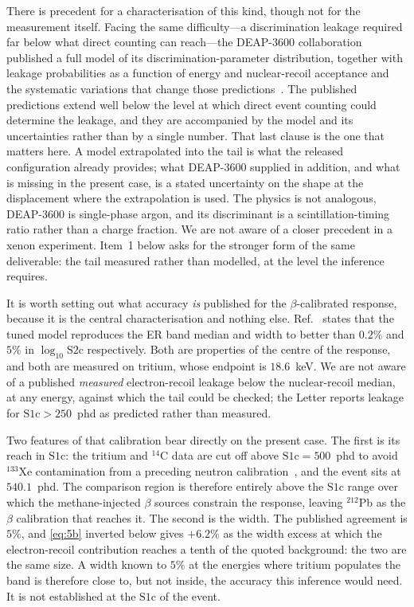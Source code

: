 \documentclass[11pt,a4paper]{article}
\begin{document}
There is precedent for a characterisation of this kind, though not for
the measurement itself. Facing the same difficulty---a discrimination
leakage required far below what direct counting can reach---the
DEAP-3600 collaboration published a full model of its
discrimination-parameter distribution, together with leakage
probabilities as a function of energy and nuclear-recoil acceptance and
the systematic variations that change those predictions~\cite{DEAP}.
The published predictions extend well below the level at which direct
event counting could determine the leakage, and they are accompanied by
the model and its uncertainties rather than by a single number. That
last clause is the one that matters here. A model
extrapolated into the tail is what the released configuration already
provides; what DEAP-3600 supplied in addition, and what is missing in
the present case, is a stated uncertainty on the shape at the
displacement where the extrapolation is used. The physics is not
analogous, DEAP-3600 is single-phase argon, and its discriminant is a
scintillation-timing ratio rather than a charge fraction. We are
not aware of a closer precedent in a xenon experiment. Item~1 below asks
for the stronger form of the same deliverable: the tail measured rather
than modelled, at the level the inference requires.

It is worth setting out what accuracy \emph{is} published for the
\(\beta\)-calibrated response, because it is the central characterisation
and nothing else. Ref.~\cite{WS2024} states that the tuned model
reproduces the ER band median and width to better than \(0.2\%\) and
\(5\%\) in \(\log_{10}\mathrm{S2c}\) respectively. Both are properties of
the centre of the response, and both are measured on tritium, whose
endpoint is \(18.6\)~keV. We are not aware of a published \emph{measured}
electron-recoil leakage below the nuclear-recoil median, at any energy,
against which the tail could be checked; the Letter reports leakage for
\(\mathrm{S1c}>250\)~phd as predicted rather than measured.

Two features of that calibration bear directly on the present case. The
first is its reach in \(\mathrm{S1c}\): the tritium and \(^{14}\)C data
are cut off above \(\mathrm{S1c}=500\)~phd to avoid \(^{133}\)Xe
contamination from a preceding neutron calibration~\cite{LZ:2026axp}, and
the event sits at \(540.1\)~phd. The comparison region is therefore
entirely above the \(\mathrm{S1c}\) range over which the methane-injected
\(\beta\) sources constrain the response, leaving \(^{212}\)Pb as the
\(\beta\) calibration that reaches it. The second is the width. The
published agreement is \(5\%\), and \cref{eq:5b} inverted below gives
\(+6.2\%\) as the width excess at which the electron-recoil contribution
reaches a tenth of the quoted background: the two are the same size. A
width known to \(5\%\) at the energies where tritium populates the band is
therefore close to, but not inside, the accuracy this inference would
need. It is not established at the \(\mathrm{S1c}\) of the event.
\end{document}
